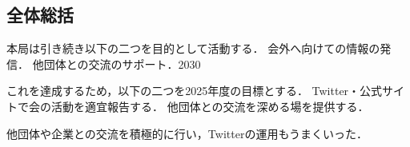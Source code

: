 \subsection*{全体総括}


本局は引き続き以下の二つを目的として活動する．
    会外へ向けての情報の発信．
    他団体との交流のサポート．2030
 
これを達成するため，以下の二つを2025年度の目標とする．
    Twitter・公式サイトで会の活動を適宜報告する．
    他団体との交流を深める場を提供する．

他団体や企業との交流を積極的に行い，Twitterの運用もうまくいった．
